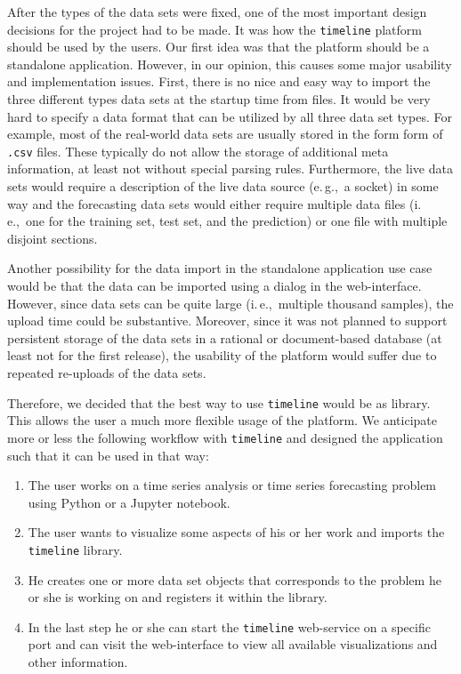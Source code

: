 \documentclass[runningheads,a4paper,11pt]{llncs}
\newcommand{\eg}{e.\,g.,\ }
\newcommand{\ie}{i.\,e.,\ }
\begin{document}
After the types of the data sets were fixed, one of the most important design decisions for the project had to be made. 
It was how the \texttt{timeline} platform should be used by the users.
Our first idea was that the platform should be a standalone application.
However, in our opinion, this causes some major usability and implementation issues.
First, there is no nice and easy way to import the three different types data sets at the startup time from files.
It would be very hard to specify a data format that can be utilized by all three data set types.
For example, most of the real-world data sets are usually stored in the form form of \texttt{.csv} files.
These typically do not allow the storage of additional meta information, at least not without special parsing rules.
Furthermore, the live data sets would require a description of the live data source (\eg a socket) in some way and the forecasting data sets would either require multiple data files (\ie one for the training set, test set, and the prediction) or one file with multiple disjoint sections.

Another possibility for the data import in the standalone application use case would be that the data can be imported using a dialog in the web-interface.
However, since data sets can be quite large (\ie multiple thousand samples), the upload time could be substantive. 
Moreover, since it was not planned to support persistent storage of the data sets in a rational or document-based database (at least not for the first release), the usability of the platform would suffer due to repeated re-uploads of the data sets. 

Therefore, we decided that the best way to use \texttt{timeline} would be as library. 
This allows the user a much more flexible usage of the platform.
We anticipate more or less the following workflow with \texttt{timeline} and designed the application such that it can be used in that way:

\begin{enumerate}
 \item The user works on a time series analysis or time series forecasting problem using Python or a Jupyter notebook.

 \item The user wants to visualize some aspects of his or her work and imports the \texttt{timeline} library.

 \item He creates one or more data set objects that corresponds to the problem he or she is working on and registers it within the library.
 
 \item In the last step he or she can start the \texttt{timeline} web-service on a specific port and can visit the web-interface to view all available visualizations and other information.
\end{enumerate}
\end{document}
